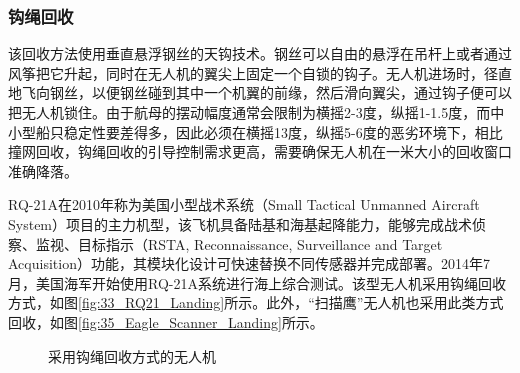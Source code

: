 \subsubsection{钩绳回收}
该回收方法使用垂直悬浮钢丝的天钩技术。钢丝可以自由的悬浮在吊杆上或者通过风筝把它升起，同时在无人机的翼尖上固定一个自锁的钩子。无人机进场时，径直地飞向钢丝，以便钢丝碰到其中一个机翼的前缘，然后滑向翼尖，通过钩子便可以把无人机锁住。由于航母的摆动幅度通常会限制为横摇2-3度，纵摇1-1.5度，而中小型船只稳定性要差得多，因此必须在横摇13度，纵摇5-6度的恶劣环境下，相比撞网回收，钩绳回收的引导控制需求更高，需要确保无人机在一米大小的回收窗口准确降落。

RQ-21A在2010年称为美国小型战术系统（Small Tactical Unmanned Aircraft System）项目的主力机型，该飞机具备陆基和海基起降能力，能够完成战术侦察、监视、目标指示（RSTA, Reconnaissance, Surveillance and Target Acquisition）功能，其模块化设计可快速替换不同传感器并完成部署。2014年7月，美国海军开始使用RQ-21A系统进行海上综合测试。该型无人机采用钩绳回收方式，如图\ref{fig:33_RQ21_Landing}所示。此外，“扫描鹰”无人机也采用此类方式回收，如图\ref{fig:35_Eagle_Scanner_Landing}所示。

\begin{figure}[htb]
	\centering%
	\hspace{0.1em}%
	\hspace{0.1em}
	\caption{采用钩绳回收方式的无人机}
	\label{fig:33_RQ21withScanner_Landing}
\end{figure}


